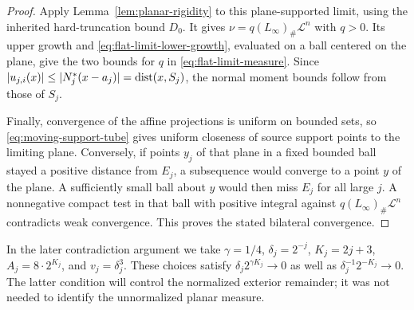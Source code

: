 \begin{proof}
Apply Lemma~\ref{lem:planar-rigidity} to this plane-supported limit, using
the inherited hard-truncation bound $D_0$.  It gives
$\nu=q(L_\infty)_\#\mathcal L^n$ with $q>0$.
Its upper growth and \eqref{eq:flat-limit-lower-growth}, evaluated on a
ball centered on the plane, give the two bounds for $q$ in
\eqref{eq:flat-limit-measure}.
Since $|u_{j,i}(x)|\le|N_j^*(x-a_j)|=\operatorname{dist}(x,S_j)$, the normal moment
bounds follow from those of $S_j$.

Finally, convergence of the affine projections is uniform on bounded
sets, so \eqref{eq:moving-support-tube} gives uniform closeness of source
support points to the limiting plane.  Conversely, if points $y_j$ of
that plane in a fixed bounded ball stayed a positive distance from $E_j$,
a subsequence would converge to a point $y$ of the plane.  A sufficiently
small ball about $y$ would then miss $E_j$ for all large $j$.  A nonnegative
compact test in that ball with positive integral against
$q(L_\infty)_\#\mathcal L^n$ contradicts weak convergence.  This proves
the stated bilateral convergence.
\end{proof}

In the later contradiction argument we take
$\gamma=1/4$, $\delta_j=2^{-j}$, $K_j=2j+3$, $A_j=8\cdot2^{K_j}$,
and $v_j=\delta_j^3$.  These choices satisfy
$\delta_j2^{\gamma K_j}\to0$ as well as
$\delta_j^{-1}2^{-K_j}\to0$.  The latter condition will control the
normalized exterior remainder; it was not needed to identify the
unnormalized planar measure.
